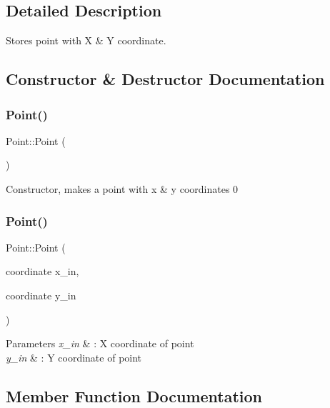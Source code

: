 \subsection{Detailed Description}
Stores point with X \& Y coordinate. 

\subsection{Constructor \& Destructor Documentation}
\mbox{\label{classPoint_ad92f2337b839a94ce97dcdb439b4325a}} 
\subsubsection{\texorpdfstring{Point()}{Point()}\hspace{0.1cm}{\footnotesize\ttfamily [1/2]}}
{\footnotesize\ttfamily Point\+::\+Point (\begin{DoxyParamCaption}{ }\end{DoxyParamCaption})}

Constructor, makes a point with x \& y coordinates 0 \mbox{\label{classPoint_af7373698b9fafc53b0a5d06e511642e1}} 
\subsubsection{\texorpdfstring{Point()}{Point()}\hspace{0.1cm}{\footnotesize\ttfamily [2/2]}}
{\footnotesize\ttfamily Point\+::\+Point (\begin{DoxyParamCaption}\item[{coordinate}]{x\+\_\+in,  }\item[{coordinate}]{y\+\_\+in }\end{DoxyParamCaption})}


\begin{DoxyParams}{Parameters}
{\em x\+\_\+in} & \+: X coordinate of point \\
\hline
{\em y\+\_\+in} & \+: Y coordinate of point \\
\hline
\end{DoxyParams}


\subsection{Member Function Documentation}
\mbox{\label{classPoint_a2bc8aed929f6be2b543ba2f26b8a5f72}} 
